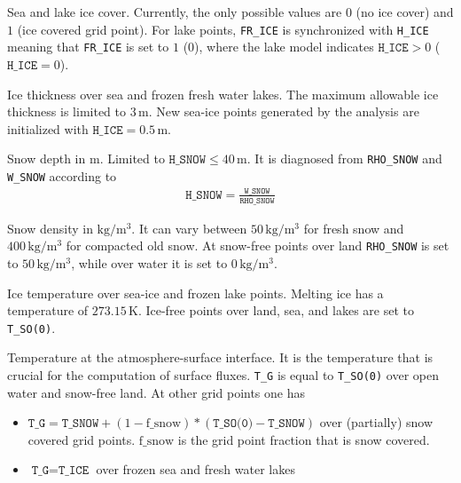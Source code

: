 \begin{description}[leftmargin=3.0cm,style=sameline]
 \item [FR\_ICE] Sea and lake ice cover. Currently, the only possible values are $0$ (no ice cover) and $1$ (ice covered grid point). For 
                 lake points, \texttt{FR\_ICE} is synchronized with \texttt{H\_ICE} meaning that \texttt{FR\_ICE} is set to $1$ ($0$), 
                 where the lake model indicates $\texttt{H\_ICE}>0$ ($\texttt{H\_ICE}=0$).

 \item [H\_ICE] Ice thickness over sea and frozen fresh water lakes. The maximum allowable ice thickness is limited to $3\,\mathrm{m}$. 
                New sea-ice points generated by the analysis are initialized with $\texttt{H\_ICE}=0.5\,\mathrm{m}$.

 \item [H\_SNOW] Snow depth in $\mathrm{m}$. Limited to $\texttt{H\_SNOW}\leq 40\,\mathrm{m}$. It is diagnosed from \texttt{RHO\_SNOW} and 
                \texttt{W\_SNOW} according to
                \begin{align*}
                   \texttt{H\_SNOW} = \frac{\texttt{W\_SNOW}}{\texttt{RHO\_SNOW}}
                \end{align*}

 \item [RHO\_SNOW] Snow density in $\mathrm{kg/m^{3}}$. It can vary between $50\,\mathrm{kg/m^{3}}$ for fresh snow and $400\,\mathrm{kg/m^{3}}$ 
                   for compacted old snow. At snow-free points over land \texttt{RHO\_SNOW} is set to $50\,\mathrm{kg/m^{3}}$, while over 
                   water it is set to $0\,\mathrm{kg/m^{3}}$.
                   
 \item [T\_ICE] Ice temperature over sea-ice and frozen lake points. Melting ice has a temperature of $273.15\,\mathrm{K}$. Ice-free 
                points over land, sea, and lakes are set to \texttt{T\_SO(0)}.

 \item [T\_G]   Temperature at the atmosphere-surface interface. It is the temperature that is crucial for the computation of surface fluxes. 
                \texttt{T\_G} is equal to \texttt{T\_SO(0)} over open water and snow-free land. At other grid points one has
                \begin{itemize} 
                  \item $\texttt{T\_G}=\texttt{T\_SNOW} + (1 - \mathrm{f\_snow})*(\texttt{T\_SO(0)} - \texttt{T\_SNOW})$ over (partially) 
                        snow covered grid points. $\mathrm{f\_snow}$ is the grid point fraction that is snow covered.
                  \item $\texttt{T\_G}=\texttt{T\_ICE}$ over frozen sea and fresh water lakes
                \end{itemize}


\end{description}
